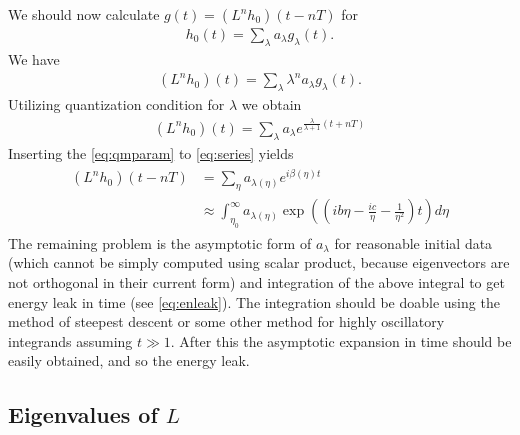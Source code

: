 \documentclass[
a4paper,%
10pt,%
titlepage,%
twoside%
]{article}
\begin{document}
We should now calculate $g(t)=(L^n h_0)(t-nT)$ for
\begin{gather}
  h_0(t)=\sum_\lambda a_\lambda g_\lambda(t).
\end{gather}
We have
\begin{gather}
  (L^n h_0)(t)=\sum_\lambda \lambda^n a_\lambda g_\lambda(t).
\end{gather}
Utilizing quantization condition for $\lambda$ we obtain
\begin{gather}\label{eq:series}
  (L^n h_0)(t) =\sum_\lambda a_\lambda e^{\frac{\lambda}{\lambda+1}(t+nT)}
\end{gather}
Inserting the \eqref{eq:qmparam} to \eqref{eq:series} yields
\begin{gather}
  \begin{split}
    (L^n h_0)(t-nT) &=\sum_\eta a_{\lambda(\eta)} e^{i\beta(\eta)t}\\
    &\approx \int_{\eta_0}^\infty a_{\lambda(\eta)}\exp((ib\eta-\frac{ic}{\eta}-\frac{1}{\eta^2})t)d\eta
  \end{split}
\end{gather}
The remaining problem is the asymptotic form of $a_{\lambda}$ for
reasonable initial data (which cannot be simply computed using scalar
product, because eigenvectors are not orthogonal in their current
form) and integration of the above integral to get energy leak in time
(see \eqref{eq:enleak}). The integration should be doable using the
method of steepest descent or some other method for highly oscillatory
integrands assuming $t\gg 1$. After this the asymptotic expansion in
time should be easily obtained, and so the energy leak.




\subsection{Eigenvalues of $L$}
\end{document}
